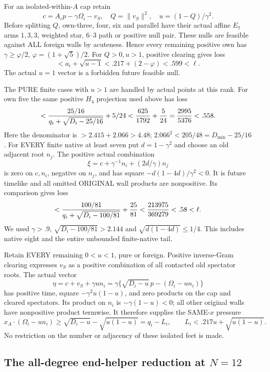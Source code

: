 For an isolated-within-\(A\) cap retain
\[
 c=A_cp-\gamma\Omega_i-v_S,\quad
 Q=\|v_S\|^2,\quad u=(1-Q)/\gamma^2 .
\]
Before splitting \(Q\), own-three, four, six
and parallel have their actual affine
\(E_7\) arms \(1,3,3\), weighted star,
\(6\)--\(3\) path or positive null pair.
These nulls are feasible against ALL foreign
walls by acuteness.
Hence every remaining positive own has
\(\gamma\ge\varphi/2\), \(\varphi=(1+\sqrt5)/2\).
For \(Q>0,u>1\), positive clearing gives loss
\[
 <a_i+\sqrt{u-1}<.217+(2-\varphi)<.599<\ell.
\]
The actual \(u=1\) vector is a forbidden
future feasible null.

The PURE finite cases with \(u>1\) are
handled by actual points at this rank.
For own five the same positive \(H_4\)
projection used above has loss
\[
 <{25/16\over q_i+\sqrt{D_i-25/16}}+5/24
 <{625\over1792}+{5\over24}
 ={2995\over5376}<.558.
\]
Here the denominator is \(>2.415+2.066>4.48\);
\(2.066^2<205/48=D_{\min}-25/16\).
For EVERY finite native at least seven put
\(d=1-\gamma^2\) and choose an old adjacent
root \(n_j\).  The positive actual combination
\[
 \xi=c+\gamma^{-1}n_i+(2d/\gamma)n_j
\]
is zero on \(c,n_i\), negative on \(n_j\),
and has square \(-d(1-4d)/\gamma^2<0\).
It is future timelike and all omitted
ORIGINAL wall products are nonpositive.
Its comparison gives loss
\[
 <{100/81\over q_i+\sqrt{D_i-100/81}}
                   +{25\over81}
 <{213975\over369279}<.58<\ell.
\]
We used \(\gamma>.9\),
\(\sqrt{D_i-100/81}>2.144\) and
\(\sqrt{d(1-4d)}\le1/4\).
This includes native eight and the entire
unbounded finite-native tail.

Retain EVERY remaining \(0<u<1\), pure or
foreign.  Positive inverse-Gram clearing
expresses \(v_S\) as a positive combination
of all contacted old spectator roots.
The actual vector
\[
 \eta=c+v_S+\gamma un_i
   =\gamma\{\sqrt{D_i-u}\,p-(\Omega_i-un_i)\}
\]
has positive time, square
\(-\gamma^2u(1-u)\), and zero products on
the cap and cleared spectators.
Its product on \(n_i\) is
\(-\gamma(1-u)<0\); all other original
walls have nonpositive product termwise.
It therefore supplies the SAME-\(x\) pressure
\[
 x_A\cdot(\Omega_i-un_i)
       \ge\sqrt{D_i-u}-\sqrt{u(1-u)}
       =q_i-L_i,\qquad
 L_i<.217u+\sqrt{u(1-u)} .
\tag{A11foot}\label{eq:arithA11foot}
\]
No restriction on the number or adjacency
of these isolated feet is made.

\subsection{The all-degree end-helper reduction at \(N=12\)}
\label{app:arithA11helperfield}

